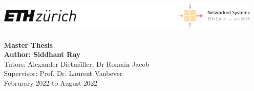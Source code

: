 \documentclass[11pt,oneside]{book}
\begin{document}
\begin{titlepage}
    \centering
    \includegraphics[width=\textwidth]{figures/eth-nsg-header}\\[60mm]
    {\Huge\bf{}}\\[10mm]
    {\Large\bf\sf Master Thesis}\\[3mm]
    {\Large\bf\sf Author: Siddhant Ray } \\[5mm]
    {\sf Tutors: Alexander Dietmüller, Dr Romain Jacob}\\[5mm]
    {\sf Supervisor: Prof. Dr. Laurent Vanbever}\\[30mm]
    {\sf Februrary 2022 to August 2022}
\end{titlepage}

\thispagestyle{empty}
\newpage
{}


\clearpage
\setcounter{tocdepth}{2}
\tableofcontents
\clearpage









\clearpage




\clearpage
\appendix
{}


\end{document}
